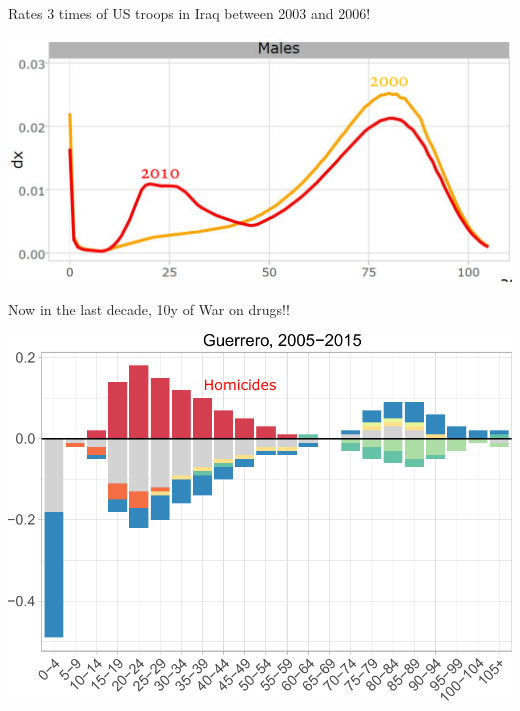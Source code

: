 \documentclass[xcolor={dvipsnames}]{beamer}
\begin{document}
\begin{frame}

\Large{
Rates 3 times of US troops in Iraq between 2003 and 2006!
				\begin{center}
		\includegraphics[scale=.45]{Figures/Distr_chihuahua}
				\end{center}				

}
\end{frame}



\begin{frame}

\Large{
Now in the last decade, 10y of War on drugs!!

				\begin{center}
		\includegraphics[scale=.65]{Figures/Cause_ed_decomp_Males_Guerrero}
				\end{center}				

}
\end{frame}
\end{document}
